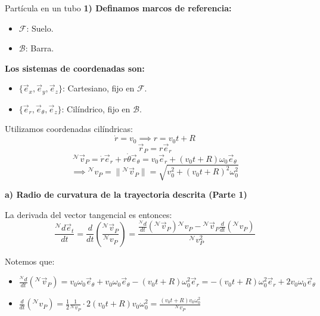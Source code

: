 \begin{solucion}{Partícula en un tubo}
\noindent\textbf{1) Definamos marcos de referencia:}
\begin{itemize}
    \item $\mathcal{F}$: Suelo.
    \item $\mathcal{B}$: Barra.
\end{itemize}

\noindent\textbf{Los sistemas de coordenadas son:}
\begin{itemize}
    \item $\{\vec{e}_x, \vec{e}_y, \vec{e}_z\}$: Cartesiano, fijo en $\mathcal{F}$.
    \item $\{\vec{e}_r, \vec{e}_\theta, \vec{e}_z\}$: Cilíndrico, fijo en $\mathcal{B}$.
\end{itemize}
\vspace{0.3cm}

\noindent Utilizamos coordenadas cilíndricas:
\[
\dot{r} = v_0 \implies r = v_0 t + R
\]
\[
\vec{r}_P = r \vec{e}_r
\]
\[
{}^{\mathcal{N}}\vec{v}_P = \dot{r}\vec{e}_r + r\dot{\theta}\vec{e}_\theta = v_0 \vec{e}_r + (v_0 t + R)\omega_0 \vec{e}_\theta
\]
\[
\implies {}^{\mathcal{N}}v_P = \|{}^{\mathcal{N}}\vec{v}_P\| = \sqrt{v_0^2 + (v_0 t + R)^2 \omega_0^2}
\]

\vspace{0.5cm}

\noindent\textbf{a) Radio de curvatura de la trayectoria descrita (Parte 1)}

\vspace{0.2cm}

\noindent La derivada del vector tangencial es entonces:
\[
\frac{{}^{\mathcal{N}}d\vec{e}_t}{dt} = \frac{d}{dt}\left(\frac{{}^{\mathcal{N}}\vec{v}_P}{{}^{\mathcal{N}}v_P}\right) = \frac{\frac{{}^{\mathcal{N}}d}{dt}({}^{\mathcal{N}}\vec{v}_P){}^{\mathcal{N}}v_P - {}^{\mathcal{N}}\vec{v}_P \frac{d}{dt}({}^{\mathcal{N}}v_P)}{{}^{\mathcal{N}}v_P^2}
\]

\noindent Notemos que:
\begin{itemize}
    \item $\frac{{}^{\mathcal{N}}d}{dt}({}^{\mathcal{N}}\vec{v}_P) = v_0 \omega_0 \vec{e}_\theta + v_0 \omega_0 \vec{e}_\theta - (v_0 t + R)\omega_0^2 \vec{e}_r = -(v_0 t + R)\omega_0^2 \vec{e}_r + 2 v_0 \omega_0 \vec{e}_\theta$
    \item $\frac{d}{dt}({}^{\mathcal{N}}v_P) = \frac{1}{2} \frac{1}{{}^{\mathcal{N}}v_P} \cdot 2 (v_0 t + R) v_0 \omega_0^2 = \frac{(v_0 t + R) v_0 \omega_0^2}{{}^{\mathcal{N}}v_P}$
\end{itemize}


\end{solucion}
